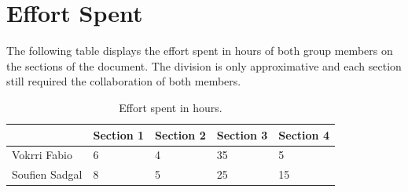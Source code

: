 \section{Effort Spent}
The following table displays the effort spent in hours of both group members on the sections of the document. The division is only approximative and each section still required the collaboration of both members.

\begin{table}[H]
    \centering
    \renewcommand{\arraystretch}{1.3}
    \begin{tabular}{|l|l|l|l|l|}
        \hline
        & \textbf{Section 1} & \textbf{Section 2} & \textbf{Section 3} & \textbf{Section 4} \\
        \hline
        Vokrri Fabio & 6 & 4 & 35 & 5 \\
        \hline 
        Soufien Sadgal & 8 & 5 & 25 & 15 \\
        \hline
    \end{tabular}
    \caption{Effort spent in hours.}
    \label{tab:effort_spent}
\end{table}